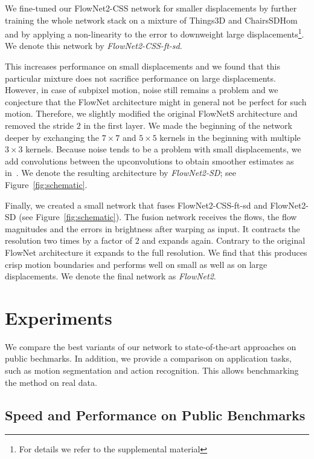 \documentclass[10pt,twocolumn,letterpaper]{article}%
\newcommand{\chairsSD}{\mbox{ChairsSDHom}\xspace}
\newcommand{\things}{\mbox{Things3D}\xspace}
\newcommand{\FN}[1]{\mbox{FlowNet2-#1}\xspace}
\begin{document}
We fine-tuned our \FN{CSS} network for smaller displacements by further training the whole network stack on a mixture of \things and \chairsSD and by applying a non-linearity to the error to downweight large displacements\footnote{For details we refer to the supplemental material}. We denote this network by \textit{\mbox{\FN{CSS-ft-sd}}}.
\addtocounter{footnote}{-1}
This increases performance on small displacements and we found that this particular mixture does not sacrifice performance on large displacements. However, in case of subpixel motion, noise still remains a problem and we conjecture that the FlowNet architecture might in general not be perfect for such motion. Therefore, we slightly modified the original FlowNetS architecture and removed the stride $2$ in the first layer. We made the beginning of the network deeper by exchanging the  $7\!\times\!7$ and $5\!\times\!5$ kernels in the beginning with multiple $3\!\times\!3$ kernels\footnotemark. Because noise tends to be a problem with small displacements, we add convolutions between the upconvolutions to obtain smoother estimates as in~\cite{MIFDB16}. We denote the resulting architecture by \textit{\mbox{\FN{SD}}}; see Figure~\ref{fig:schematic}.
\addtocounter{footnote}{-1}

Finally, we created a small network that fuses \FN{CSS-ft-sd} and \FN{SD} (see Figure~\ref{fig:schematic}). The fusion network receives the flows, the flow magnitudes and the errors in brightness after warping as input. It contracts the resolution two times by a factor of $2$ and expands again\footnotemark. Contrary to the original FlowNet architecture it expands to the full resolution. We find that this produces crisp motion boundaries and performs well on small as well as on large displacements. We denote the final network as \textit{FlowNet2}. 

\section{Experiments} 
\label{sec:experiments}

We compare the best variants of our network to state-of-the-art approaches on public bechmarks. In addition, we provide a comparison on application tasks, such as motion segmentation and action recognition. This allows benchmarking the method on real data. 

\subsection{Speed and Performance on Public Benchmarks}
\end{document}
